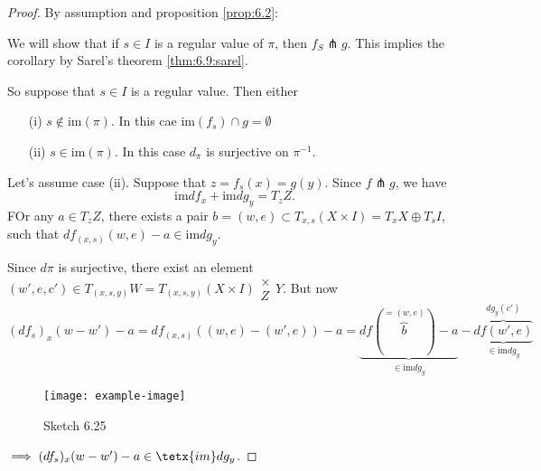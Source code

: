 \begin{proof}
    By assumption and proposition \ref{prop:6.2}: 
    \begin{center}
    \end{center}
    We will show that if \(s\in I\) is a regular value of \(\pi\), then \(f_S\pitchfork g\). This implies the corollary
    by Sarel's theorem \ref{thm:6.9:sarel}.
    
    So suppose that \(s\in I \) is a regular value. Then either 
    \begin{enumerate}
        \item[(i)] \(s\notin\text{im}(\pi)\). In this cae \(\text{im}(f_s)\cap g=\emptyset\)
        \item[(ii)] \(s\in\text{im}(\pi)\). In this case \(d_\pi\)  is surjective on \(\pi^{-1}\). 
    \end{enumerate}
    Let's assume case (ii). Suppose that \(z=f_s(x)=g(y)\). Since  \(f\pitchfork g\), we have 
    \[\text{im}df_x+\text{im}dg_y=T_zZ.\]
    FOr any \(a\in T_zZ\), there exists a pair \(b=(w,e)\subset T_{x,s}(X\times I)=T_xX\oplus T_sI\),
    such that \(df_{(x,s)}(w,e)-a\in \text{im}dg_y.\) 

    Since \(d\pi\) is surjective, there exist an element \((w',e,c')\in T_{(x,s,y)}W=T_{(x,s,y)}(X\times I)\substack{\times\\Z}Y\).
    But now \[(df_s)_x(w-w')-a=df_{(x,s)}((w,e)-(w',e))-a=\underbrace{df(\overbrace{b}^{=(w,e)})-a}_{\in \text{im}dg_y}-\underbrace{\overbrace{df(w',e)}^{dg_y(c')}}_{\in \text{im}dg_y}\]
    \begin{figure}[H]\label{fig:6.25}
        \centering
        \texttt{[image: example-image]}
        \caption{Sketch 6.25}
    \end{figure}
    \(\implies (df_s)_x(w-w')-a\in \tetx{im}dg_y\).

\end{proof}

